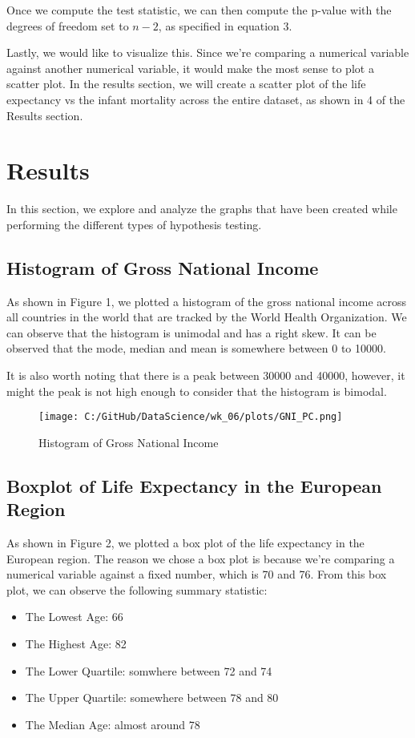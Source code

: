 \documentclass[a4paper, twocolumn]{article}
\begin{document}
Once we compute the test statistic, we can then compute the p-value with the degrees of freedom set to $n-2$,
as specified in equation 3.

Lastly, we would like to visualize this. Since we're comparing a numerical variable against another numerical 
variable, it would make the most sense to plot a scatter plot. In the results section, we will create a scatter plot
of the life expectancy vs the infant mortality across the entire dataset, as shown in 4 of the Results section.


\section{Results}
In this section, we explore and analyze the graphs that have been created while performing the different types of
hypothesis testing. 

\subsection{Histogram of Gross National Income}
As shown in Figure 1, we plotted a histogram of the gross national income across all countries in the world that are 
tracked by the World Health Organization. We can observe that the histogram is unimodal and has a right skew. It can
be observed that the mode, median and mean is somewhere between 0 to 10000.

It is also worth noting that there is a peak between 30000 and 40000, however, it might the peak is not high enough
to consider that the histogram is bimodal. 

\begin{figure}[htbp] 
    \centering
    \texttt{[image: C:/GitHub/DataScience/wk\_06/plots/GNI\_PC.png]}
    \caption{Histogram of Gross National Income} 
\end{figure}


\subsection{Boxplot of Life Expectancy in the European Region}
As shown in Figure 2, we plotted a box plot of the life expectancy in the European region. The reason we chose a
box plot is because we're comparing a numerical variable against a fixed number, which is 70 and 76. From this box
plot, we can observe the following summary statistic:

\begin{itemize}
    \item The Lowest Age: 66
    \item The Highest Age: 82
    \item The Lower Quartile: somwhere between 72 and 74
    \item The Upper Quartile: somewhere between 78 and 80
    \item The Median Age: almost around 78
\end{itemize}
\end{document}

